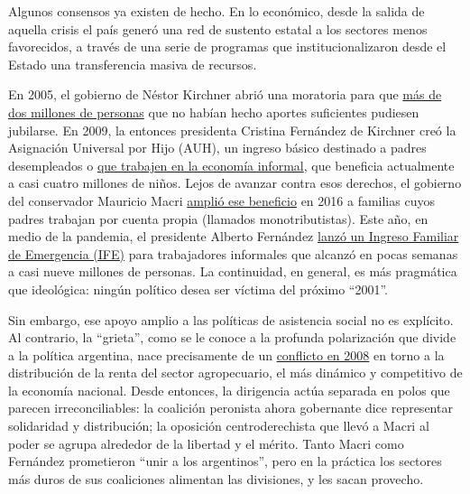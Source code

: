Algunos consensos ya existen de hecho. En lo económico, desde la salida
de aquella crisis el país generó una red de sustento estatal a los
sectores menos favorecidos, a través de una serie de programas que
institucionalizaron desde el Estado una transferencia masiva de
recursos.

En 2005, el gobierno de Néstor Kirchner abrió una moratoria para que
\href{https://www.batimes.com.ar/news/argentina/mario-ishii-by-late-august-well-be-where-we-were-in-2001.phtml}{más
de dos millones de personas} que no habían hecho aportes suficientes
pudiesen jubilarse. En 2009, la entonces presidenta Cristina Fernández
de Kirchner creó la Asignación Universal por Hijo (AUH), un ingreso
básico destinado a padres desempleados o
\href{https://www.baenegocios.com/economia/Con-el-fin-del-IFE-aparecera-el-Ingreso-Universal-Quienes-lo-cobraran-20200714-0017.html}{que
trabajen en la economía informal}, que beneficia actualmente a casi
cuatro millones de niños. Lejos de avanzar contra esos derechos, el
gobierno del conservador Mauricio Macri
\href{https://www.lanacion.com.ar/politica/el-gobierno-amplia-la-asignacion-por-hijo-y-anuncia-baja-del-iva-nid1889924}{amplió
ese beneficio} en 2016 a familias cuyos padres trabajan por cuenta
propia (llamados monotributistas). Este año, en medio de la pandemia, el
presidente Alberto Fernández
\href{https://www.pagina12.com.ar/277812-el-ife-llego-a-los-sectores-mas-sumergidos-e-invisibilizados}{lanzó
un Ingreso Familiar de Emergencia (IFE)} para trabajadores informales
que alcanzó en pocas semanas a casi nueve millones de personas. La
continuidad, en general, es más pragmática que ideológica: ningún
político desea ser víctima del próximo ``2001''.

Sin embargo, ese apoyo amplio a las políticas de asistencia social no es
explícito. Al contrario, la ``grieta'', como se le conoce a la profunda
polarización que divide a la política argentina, nace precisamente de un
\href{https://www.france24.com/es/20191023-kirchneristas-antikirchneristas-fin-grieta-argentina}{conflicto
en 2008} en torno a la distribución de la renta del sector agropecuario,
el más dinámico y competitivo de la economía nacional. Desde entonces,
la dirigencia actúa separada en polos que parecen irreconciliables: la
coalición peronista ahora gobernante dice representar solidaridad y
distribución; la oposición centroderechista que llevó a Macri al poder
se agrupa alrededor de la libertad y el mérito. Tanto Macri como
Fernández prometieron ``unir a los argentinos'', pero en la práctica los
sectores más duros de sus coaliciones alimentan las divisiones, y les
sacan provecho.

